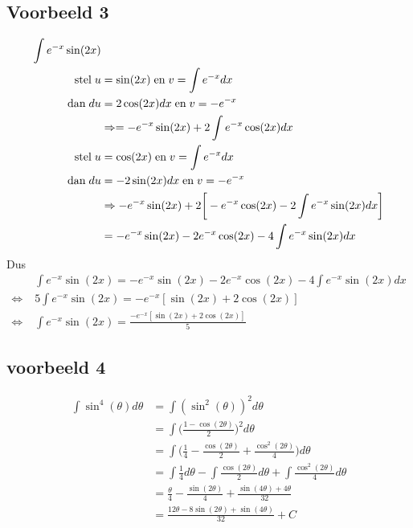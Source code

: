 \documentclass[12pt]{report}
\begin{document}
\subsection{Voorbeeld 3}
\begin{equation*}
	\begin{split}
		\int e^{-x}\sin(2x) & \\
		\hbox{stel}\; u & = \sin(2x) \; \hbox{en}\; v = \int e^{-x}dx\\
		\hbox{dan}\; du & = 2\cos(2x)dx \; \hbox{en}\; v = -e^{-x}\\
		& \Rightarrow= -e^{-x}\sin(2x) + 2 \int e^{-x}\cos(2x) dx\\
		\hbox{stel}\; u & = \cos(2x) \; \hbox{en}\; v = \int e^{-x}dx\\
		\hbox{dan}\; du & = -2\sin(2x)dx \; \hbox{en}\; v = -e^{-x}\\
		& \Rightarrow -e^{-x}\sin(2x) + 2\bigg[-e^{-x}\cos(2x)  - 2\int e^{-x}\sin(2x)dx   \bigg]\\
		& = -e^{-x}\sin(2x) - 2e^{-x}\cos(2x) -  4\int e^{-x}\sin(2x)dx\\
	\end{split}
\end{equation*}
Dus
\begin{equation*}
	\begin{split}
		& \int e^{-x}\sin(2x)  = -e^{-x}\sin(2x) - 2e^{-x}\cos(2x) -  4\int e^{-x}\sin(2x)dx \\
		\Leftrightarrow\; &  5\int e^{-x}\sin(2x) = -e^{-x}[\sin(2x) + 2\cos(2x)] \\
		\Leftrightarrow\; & \int e^{-x}\sin(2x) = \frac{-e^{-x}[\sin(2x) + 2\cos(2x)]}{5}
	\end{split}
\end{equation*}
\subsection{voorbeeld 4}
\begin{equation*}
	\begin{split}
		\int \sin^4(\theta) d\theta & = \int (\sin^2(\theta))^2 d\theta \\
		& = \int \bigg(\frac{1 - \cos(2\theta)}{2}\bigg)^2 d\theta \\
		& = \int \bigg(\frac{1}{4} - \frac{\cos(2\theta)}{2} + \frac{\cos^2(2\theta)}{4} \bigg)d\theta \\
		& = \int \frac{1}{4}d\theta - \int \frac{\cos(2\theta)}{2}d\theta + \int \frac{\cos^2(2\theta)}{4}d\theta \\
		& = \frac{\theta}{4} - \frac{\sin(2\theta)}{4} + \frac{\sin(4\theta) + 4\theta}{32} \\
		& = \frac{12\theta - 8\sin(2\theta) + \sin(4\theta)}{32} + C
	\end{split}
\end{equation*}
\end{document}
